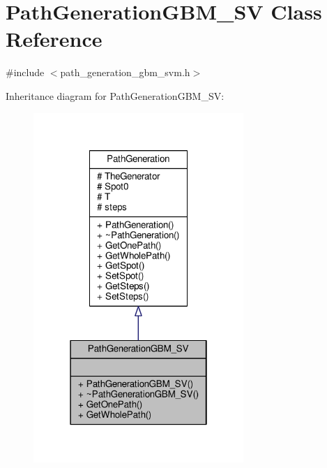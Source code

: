 \hypertarget{classPathGenerationGBM__SV}{}\section{Path\+Generation\+G\+B\+M\+\_\+\+SV Class Reference}
\label{classPathGenerationGBM__SV}


{\ttfamily \#include $<$path\+\_\+generation\+\_\+gbm\+\_\+svm.\+h$>$}



Inheritance diagram for Path\+Generation\+G\+B\+M\+\_\+\+SV\+:
\nopagebreak
\begin{figure}[H]
\begin{center}
\leavevmode
\includegraphics[width=226pt]{classPathGenerationGBM__SV__inherit__graph}
\end{center}
\end{figure}


